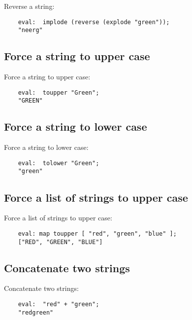 Reverse a string:
\begin{verbatim}
    eval:  implode (reverse (explode "green"));
    "neerg"
\end{verbatim}

\cutend*

\subsection{Force a string to upper case}

Force a string to upper case:
\begin{verbatim}
    eval:  toupper "Green";
    "GREEN"
\end{verbatim}

\cutend*

\subsection{Force a string to lower case}

Force a string to lower case:
\begin{verbatim}
    eval:  tolower "Green";
    "green"
\end{verbatim}

\cutend*

\subsection{Force a list of strings to upper case}

Force a list of strings to upper case:
\begin{verbatim}
    eval: map toupper [ "red", "green", "blue" ];
    ["RED", "GREEN", "BLUE"]
\end{verbatim}

\cutend*

\subsection{Concatenate two strings}

Concatenate two strings:
\begin{verbatim}
    eval:  "red" + "green";
    "redgreen"
\end{verbatim}

